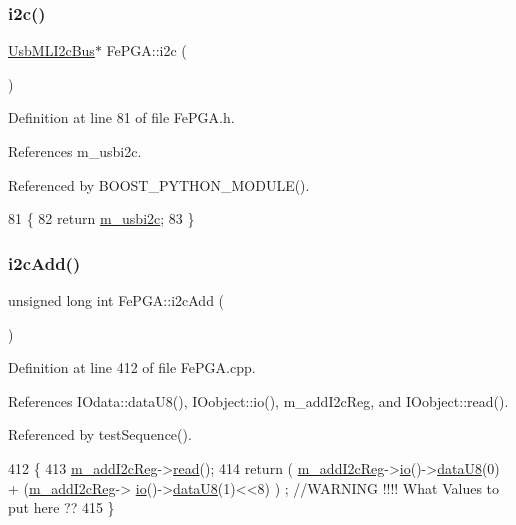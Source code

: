\subsubsection{\texorpdfstring{i2c()}{i2c()}}
{\footnotesize\ttfamily \hyperlink{classUsbMLI2cBus}{Usb\+M\+L\+I2c\+Bus}$\ast$ Fe\+P\+G\+A\+::i2c (\begin{DoxyParamCaption}{ }\end{DoxyParamCaption})\hspace{0.3cm}{\ttfamily [inline]}}



Definition at line 81 of file Fe\+P\+G\+A.\+h.



References m\+\_\+usbi2c.



Referenced by B\+O\+O\+S\+T\+\_\+\+P\+Y\+T\+H\+O\+N\+\_\+\+M\+O\+D\+U\+L\+E().


\begin{DoxyCode}
81                     \{
82     \textcolor{keywordflow}{return} \hyperlink{classFePGA_a09fdde4002008daa0d15672772dd4483}{m\_usbi2c};
83   \}
\end{DoxyCode}
\mbox{\label{classFePGA_a26b690b730b5f668ab28fb8deab8326b}} 
\subsubsection{\texorpdfstring{i2c\+Add()}{i2cAdd()}}
{\footnotesize\ttfamily unsigned long int Fe\+P\+G\+A\+::i2c\+Add (\begin{DoxyParamCaption}{ }\end{DoxyParamCaption})}



Definition at line 412 of file Fe\+P\+G\+A.\+cpp.



References I\+Odata\+::data\+U8(), I\+Oobject\+::io(), m\+\_\+add\+I2c\+Reg, and I\+Oobject\+::read().



Referenced by test\+Sequence().


\begin{DoxyCode}
412                                \{
413   \hyperlink{classFePGA_af3ef3467ba803e6d3b970ea8982d6246}{m\_addI2cReg}->\hyperlink{classIOobject_aa07610c11963b1db6710e3c76ceea456}{read}();
414   \textcolor{keywordflow}{return} ( \hyperlink{classFePGA_af3ef3467ba803e6d3b970ea8982d6246}{m\_addI2cReg}->\hyperlink{classIOobject_af04fb94137c3d86849f478ac5afab5d1}{io}()->\hyperlink{classIOdata_a75e9c318dbac3a39402179070943d4bc}{dataU8}(0) + (\hyperlink{classFePGA_af3ef3467ba803e6d3b970ea8982d6246}{m\_addI2cReg}->
      \hyperlink{classIOobject_af04fb94137c3d86849f478ac5afab5d1}{io}()->\hyperlink{classIOdata_a75e9c318dbac3a39402179070943d4bc}{dataU8}(1)<<8) ) ; \textcolor{comment}{//WARNING !!!! What Values to put here ??}
415 \}
\end{DoxyCode}
\mbox{\label{classFePGA_a5577463c8478cb6d54fc3c75b26cd819}} 
